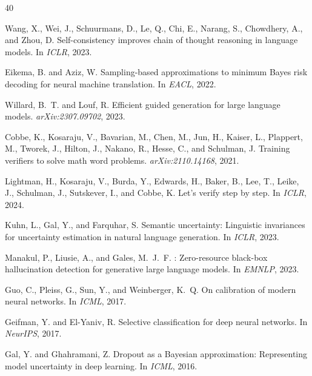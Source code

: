 \documentclass[11pt,a4paper]{article}
\begin{document}
\begin{thebibliography}{40}

Wang, X., Wei, J., Schuurmans, D., Le, Q., Chi, E., Narang, S., Chowdhery, A., and Zhou, D.
\newblock Self-consistency improves chain of thought reasoning in language models.
\newblock In \emph{ICLR}, 2023.

Eikema, B. and Aziz, W.
\newblock Sampling-based approximations to minimum {B}ayes risk decoding for neural machine translation.
\newblock In \emph{EACL}, 2022.

Willard, B.~T. and Louf, R.
\newblock Efficient guided generation for large language models.
\newblock \emph{arXiv:2307.09702}, 2023.

Cobbe, K., Kosaraju, V., Bavarian, M., Chen, M., Jun, H., Kaiser, L., Plappert, M., Tworek, J., Hilton, J., Nakano, R., Hesse, C., and Schulman, J.
\newblock Training verifiers to solve math word problems.
\newblock \emph{arXiv:2110.14168}, 2021.

Lightman, H., Kosaraju, V., Burda, Y., Edwards, H., Baker, B., Lee, T., Leike, J., Schulman, J., Sutskever, I., and Cobbe, K.
\newblock Let's verify step by step.
\newblock In \emph{ICLR}, 2024.

Kuhn, L., Gal, Y., and Farquhar, S.
\newblock Semantic uncertainty: Linguistic invariances for uncertainty estimation in natural language generation.
\newblock In \emph{ICLR}, 2023.

Manakul, P., Liusie, A., and Gales, M.~J.~F.
: Zero-resource black-box hallucination detection for generative large language models.
\newblock In \emph{EMNLP}, 2023.

Guo, C., Pleiss, G., Sun, Y., and Weinberger, K.~Q.
\newblock On calibration of modern neural networks.
\newblock In \emph{ICML}, 2017.

Geifman, Y. and El-Yaniv, R.
\newblock Selective classification for deep neural networks.
\newblock In \emph{NeurIPS}, 2017.

Gal, Y. and Ghahramani, Z.
\newblock Dropout as a {B}ayesian approximation: Representing model uncertainty in deep learning.
\newblock In \emph{ICML}, 2016.


\end{thebibliography}
\end{document}
